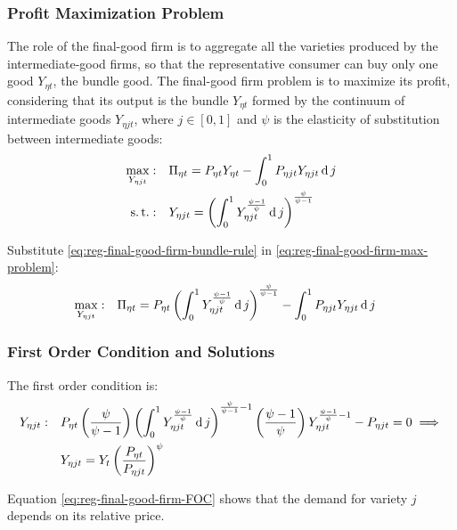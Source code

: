 \documentclass[
	thesis.tex
	]{subfiles}
\begin{document}
\subsubsection*{Profit Maximization Problem}

The role of the final-good firm is to aggregate all the varieties produced by the intermediate-good firms, so that the representative consumer can buy only one good $Y_{\eta t}$, the bundle good. The final-good firm problem is to maximize its profit, considering that its output is the bundle $Y_{\eta t}$ formed by the continuum of intermediate goods $Y_{\eta jt}$, where $j \in [0,1]$ and $\psi$ is the elasticity of substitution between intermediate goods:
\begin{align}
	\max_{Y_{\eta jt}}: &\quad \Pi_{\eta t} = P_{\eta t} Y_{\eta t} - \int_{0}^{1} P_{\eta jt} Y_{\eta jt} \operatorname{d} j \label{eq:reg-final-good-firm-max-problem} \\
	\operatorname{s.t.}: & \quad Y_{\eta jt} = \left( \int_{0}^{1} Y_{\eta jt}^{\frac{\psi-1}{\psi}} \operatorname{d} j \right)^{\frac{\psi}{\psi-1}} \label{eq:reg-final-good-firm-bundle-rule}
\end{align}

Substitute \ref{eq:reg-final-good-firm-bundle-rule} in \ref{eq:reg-final-good-firm-max-problem}:
\begin{align}
	\label{eq:reg-final-good-firm-max-problem-2}
	\max_{Y_{\eta jt}}: & \quad \Pi_{\eta t} = P_{\eta t} \left( \int_{0}^{1} Y_{\eta jt}^{\frac{\psi-1}{\psi}} \operatorname{d} j \right)^{\frac{\psi}{\psi-1}} - \int_{0}^{1} P_{\eta jt} Y_{\eta jt} \operatorname{d} j
\end{align}

\subsubsection*{First Order Condition and Solutions}

The first order condition is:
\begin{align}
	Y_{\eta jt}:\quad & P_{\eta t} \left( \frac{\psi}{\psi-1} \right) \left( \int_{0}^{1} Y_{\eta jt}^{\frac{\psi-1}{\psi}} \operatorname{d} j \right)^{\frac{\psi}{\psi-1}-1} \left( \frac{\psi-1}{\psi} \right) Y_{\eta jt}^{\frac{\psi-1}{\psi}-1} - P_{\eta jt} = 0 \implies \nonumber \\
	\label{eq:reg-final-good-firm-FOC}
	& Y_{\eta jt} = Y_t \left( \frac{P_{\eta t}}{P_{\eta jt}} \right)^{\psi}
\end{align}

Equation \ref{eq:reg-final-good-firm-FOC} shows that the demand for variety $j$ depends on its relative price. 
\end{document}
